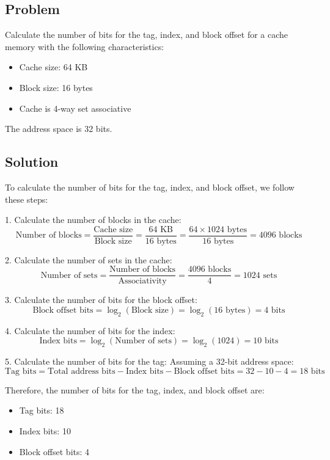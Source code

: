 \subsection*{Problem}

Calculate the number of bits for the tag, index, and block offset for a cache memory with the following characteristics:
\begin{itemize}
    \item Cache size: 64 KB
    \item Block size: 16 bytes
    \item Cache is 4-way set associative
\end{itemize}
The address space is 32 bits.

\subsection*{Solution}

To calculate the number of bits for the tag, index, and block offset, we follow these steps:

1. Calculate the number of blocks in the cache:
\[
\text{Number of blocks} = \frac{\text{Cache size}}{\text{Block size}} = \frac{64 \text{ KB}}{16 \text{ bytes}} = \frac{64 \times 1024 \text{ bytes}}{16 \text{ bytes}} = 4096 \text{ blocks}
\]

2. Calculate the number of sets in the cache:
\[
\text{Number of sets} = \frac{\text{Number of blocks}}{\text{Associativity}} = \frac{4096 \text{ blocks}}{4} = 1024 \text{ sets}
\]

3. Calculate the number of bits for the block offset:
\[
\text{Block offset bits} = \log_2(\text{Block size}) = \log_2(16 \text{ bytes}) = 4 \text{ bits}
\]

4. Calculate the number of bits for the index:
\[
\text{Index bits} = \log_2(\text{Number of sets}) = \log_2(1024) = 10 \text{ bits}
\]

5. Calculate the number of bits for the tag:
Assuming a 32-bit address space:
\[
\text{Tag bits} = \text{Total address bits} - \text{Index bits} - \text{Block offset bits} = 32 - 10 - 4 = 18 \text{ bits}
\]

Therefore, the number of bits for the tag, index, and block offset are:
\begin{itemize}
    \item Tag bits: 18
    \item Index bits: 10
    \item Block offset bits: 4
\end{itemize}